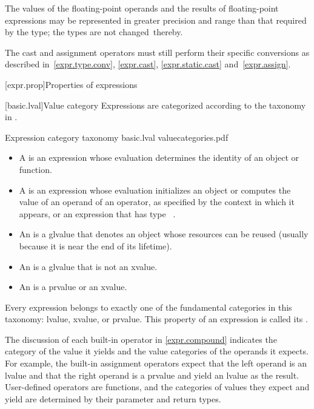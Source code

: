 \pnum
The values of the floating-point operands and
the results of floating-point expressions
may be represented in greater precision and range than that
required by the type; the types are not changed\
thereby.
\begin{footnote}
The cast and assignment operators must still perform their specific
conversions as described in~\ref{expr.type.conv}, \ref{expr.cast},
\ref{expr.static.cast} and~\ref{expr.assign}.
\end{footnote}

[expr.prop]{Properties of expressions}

[basic.lval]{Value category}
\pnum
Expressions are categorized according to the taxonomy in .

\begin{importgraphic}
{Expression category taxonomy}
{basic.lval}
{valuecategories.pdf}
\end{importgraphic}

\begin{itemize}
\item A  is an expression whose evaluation determines the identity of an object or function.
\item A \defn{prvalue} is an expression whose evaluation initializes an object
or computes the value of an operand of an operator,
as specified by the context in which it appears,
or an expression that has type \cv{}~.
\item An  is a glvalue that denotes an object whose resources can be reused (usually because it is near the end of its lifetime).
\item An \defn{lvalue} is a glvalue that is not an xvalue.
\item An  is a prvalue or an xvalue.
\end{itemize}

\pnum
Every expression belongs to exactly one of the fundamental categories in this
taxonomy: lvalue, xvalue, or prvalue. This property of an expression is called
its \defn{value category}.
\begin{note}
The discussion of each built-in operator in
\ref{expr.compound} indicates the category of the value it yields and the value categories
of the operands it expects. For example, the built-in assignment operators expect that
the left operand is an lvalue and that the right operand is a prvalue and yield an
lvalue as the result. User-defined operators are functions, and the categories of
values they expect and yield are determined by their parameter and return types.
\end{note}

